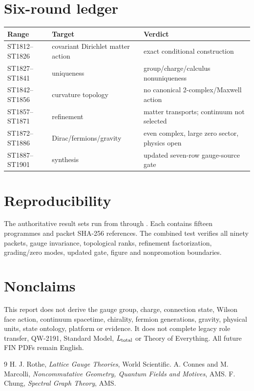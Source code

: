 \documentclass[11pt,a4paper]{article}
\begin{document}
\section{Six-round ledger}
\begin{longtable}{@{}p{}p{}p{}@{}}
\toprule
Range & Target & Verdict \\
\midrule\endhead
ST1812--ST1826 & covariant Dirichlet matter action & exact conditional construction \\
ST1827--ST1841 & uniqueness & group/charge/calculus nonuniqueness \\
ST1842--ST1856 & curvature topology & no canonical 2-complex/Maxwell action \\
ST1857--ST1871 & refinement & matter transports; continuum not selected \\
ST1872--ST1886 & Dirac/fermions/gravity & even complex, large zero sector, physics open \\
ST1887--ST1901 & synthesis & updated seven-row gauge-source gate \\
\bottomrule
\end{longtable}

\section{Reproducibility}
The authoritative result sets run from
 through
.  Each contains fifteen programmes and
packet SHA-256 references.  The combined test
 verifies all ninety packets, gauge invariance,
topological ranks, refinement factorization, grading/zero modes, updated gate,
figure and nonpromotion boundaries.

\section{Nonclaims}
This report does not derive the gauge group, charge, connection state, Wilson
face action, continuum spacetime, chirality, fermion generations, gravity,
physical units, state ontology, platform or evidence.  It does not complete
legacy role transfer, QW-2191, Standard Model, $L_{\rm total}$ or Theory of
Everything.  All future FIN PDFs remain English.

\begin{thebibliography}{9}
 H. J. Rothe, \emph{Lattice Gauge Theories}, World Scientific.
 A. Connes and M. Marcolli, \emph{Noncommutative Geometry, Quantum Fields and Motives}, AMS.
 F. Chung, \emph{Spectral Graph Theory}, AMS.
\end{thebibliography}
\end{document}
